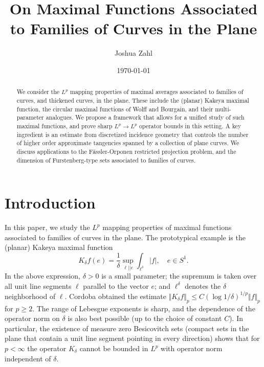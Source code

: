 \documentclass[letterpaper, reqno,11pt]{article}
\title{On Maximal Functions Associated to Families of Curves in the Plane}
\author{Joshua Zahl}%
\date{\today}
\numberwithin{equation}{section}
\numberwithin{thm}{section}
\theoremstyle{remark}
\begin{document}
\maketitle

\begin{abstract}
We consider the $L^p$ mapping properties of maximal averages associated to families of curves, and thickened curves, in the plane. These include the (planar) Kakeya maximal function, the circular maximal functions of Wolff and Bourgain, and their multi-parameter analogues. We propose a framework that allows for a unified study of such maximal functions, and prove sharp $L^p\to L^p$ operator bounds in this setting. A key ingredient is an estimate from discretized incidence geometry that controls the number of higher order approximate tangencies spanned by a collection of plane curves. We discuss applications to the F\"assler-Orponen restricted projection problem, and the dimension of Furstenberg-type sets associated to families of curves.
\end{abstract}


\section{Introduction}
In this paper, we study the $L^p$ mapping properties of maximal functions associated to families of curves in the plane. The prototypical example is the (planar) Kakeya maximal function
\begin{equation}\label{KakeyaMaximalOperator}
K_\delta f (e) = \frac{1}{\delta} \sup_{\ell |\!| e}\int_{\ell^\delta}|f|,\quad e\in S^1.
\end{equation}
In the above expression, $\delta>0$ is a small parameter; the supremum is taken over all unit line segments $\ell$ parallel to the vector $e$; and $\ell^\delta$ denotes the $\delta$ neighborhood of $\ell$. Cordoba \cite{cordoba} obtained the estimate $\Vert K_\delta f\Vert_p \leq C (\log 1/\delta)^{1/p} \Vert f\Vert_{p}$ for $p\geq 2$. The range of Lebesgue exponents is sharp, and the dependence of the operator norm on $\delta$ is also best possible (up to the choice of constant $C$). In particular, the existence of measure zero Besicovitch sets (compact sets in the plane that contain a unit line segment pointing in every direction) shows that for $p<\infty$ the operator $K_\delta$ cannot be bounded in $L^p$ with operator norm independent of $\delta$.
\end{document}
